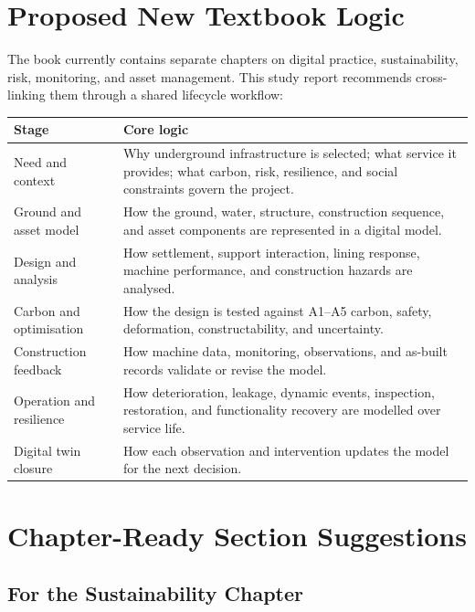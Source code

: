 \documentclass[11pt]{article}
\begin{document}
\section{Proposed New Textbook Logic}

The book currently contains separate chapters on digital practice,
sustainability, risk, monitoring, and asset management. This study report
recommends cross-linking them through a shared lifecycle workflow:

\begin{center}
\begin{tabular}{>{\raggedright\arraybackslash}p{}
                >{\raggedright\arraybackslash}p{}}
\toprule
\textbf{Stage} & \textbf{Core logic} \\
\midrule
Need and context &
Why underground infrastructure is selected; what service it provides; what
carbon, risk, resilience, and social constraints govern the project. \\
Ground and asset model &
How the ground, water, structure, construction sequence, and asset components
are represented in a digital model. \\
Design and analysis &
How settlement, support interaction, lining response, machine performance,
and construction hazards are analysed. \\
Carbon and optimisation &
How the design is tested against A1--A5 carbon, safety, deformation,
constructability, and uncertainty. \\
Construction feedback &
How machine data, monitoring, observations, and as-built records validate or
revise the model. \\
Operation and resilience &
How deterioration, leakage, dynamic events, inspection, restoration, and
functionality recovery are modelled over service life. \\
Digital twin closure &
How each observation and intervention updates the model for the next decision.
\\
\bottomrule
\end{tabular}
\end{center}

\section{Chapter-Ready Section Suggestions}

\subsection*{For the Sustainability Chapter}
\end{document}
